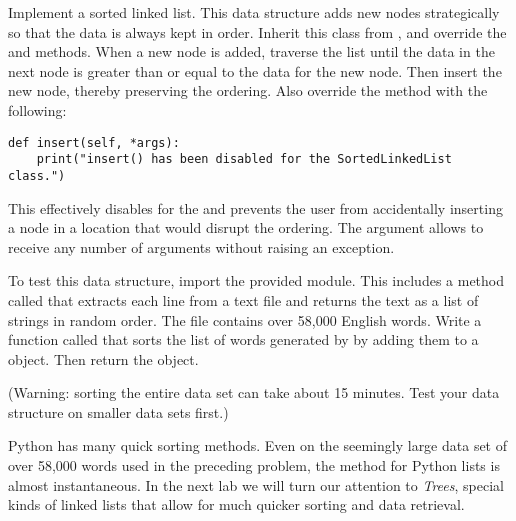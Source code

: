 \begin{problem}
Implement a sorted linked list.
This data structure adds new nodes strategically so that the data is always kept in order.
Inherit this class from , and override the  and  methods.
When a new node is added, traverse the list until the data in the next node is greater than or equal to the data for the new node.
Then insert the new node, thereby preserving the ordering.
Also override the  method with the following:

\begin{lstlisting}
def insert(self, *args):
	print("insert() has been disabled for the SortedLinkedList class.")
\end{lstlisting}

This effectively disables  for the  and prevents the user from accidentally inserting a node in a location that would disrupt the ordering.
The  argument allows  to receive any number of arguments without raising an exception.

To test this data structure, import the provided  module.
This includes a method called  that extracts each line from a text file and returns the text as a list of strings in random order.
The file  contains over 58,000 English words.
Write a function called  that sorts the list of words generated by  by adding them to a  object.
Then return the object.

(Warning: sorting the entire data set can take about 15 minutes. Test your data structure on smaller data sets first.)
\end{problem}

Python has many quick sorting methods.
Even on the seemingly large data set of over 58,000 words used in the preceding problem, the  method for Python lists is almost instantaneous.
In the next lab we will turn our attention to \emph{Trees}, special kinds of linked lists that allow for much quicker sorting and data retrieval.




